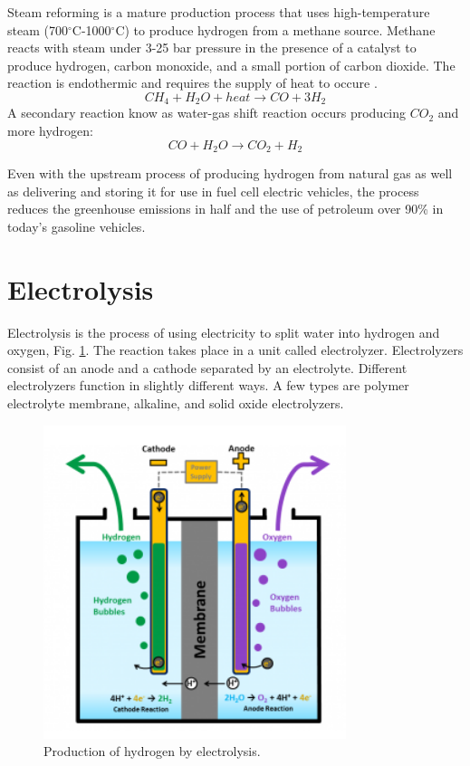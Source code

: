 \documentclass{anstrans}
\begin{document}
Steam reforming is a mature production process that uses high-temperature steam (700$^{\circ}$C-1000$^{\circ}$C) to produce hydrogen from a methane source. Methane reacts with steam under 3-25 bar pressure in the presence of a catalyst to produce hydrogen, carbon monoxide, and a small portion of carbon dioxide. The reaction is endothermic and requires the supply of heat to occure \cite{noauthor_hydrogen_nodate}.
\begin{equation}
CH_4 + H_2O + heat \rightarrow CO + 3H_2
\end{equation}
A secondary reaction know as water-gas shift reaction occurs producing $CO_2$ and more hydrogen:
\begin{equation}
CO + H_2O \rightarrow CO_2 + H_2
\end{equation}

Even with the upstream process of producing hydrogen from natural gas as well as delivering and storing it for use in fuel cell electric vehicles, the process reduces the greenhouse emissions in half and the use of petroleum over 90\% in today's gasoline vehicles.

\section{Electrolysis}

Electrolysis is the process of using electricity to split water into hydrogen and oxygen, Fig. \ref{fig:electro}. The reaction takes place in a unit called electrolyzer. Electrolyzers consist of an anode and a cathode separated by an electrolyte. Different electrolyzers function in slightly different ways. A few types are polymer electrolyte membrane, alkaline, and solid oxide electrolyzers.

\begin{figure}[H]
	\centering
	\includegraphics[width=0.4\linewidth]{figures/electrolysis.png}
	\hfill
	\caption{Production of hydrogen by electrolysis.}
	\label{fig:electro}
\end{figure}
\end{document}

